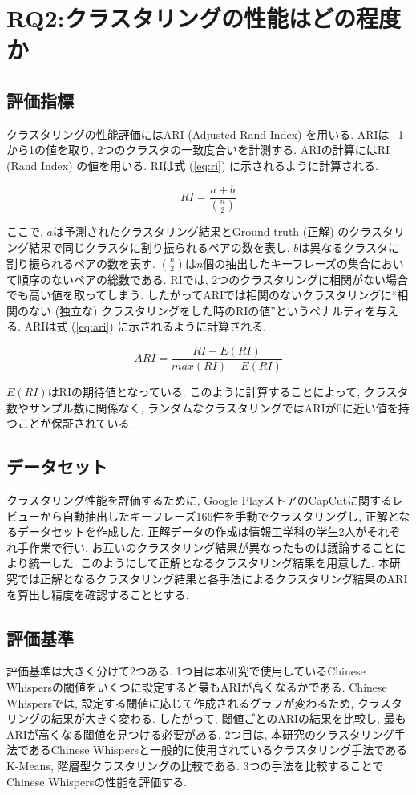 \section{RQ2:クラスタリングの性能はどの程度か}
\subsection{評価指標}
クラスタリングの性能評価にはARI (Adjusted Rand Index) を用いる. ARIは$-$1から1の値を取り, 2つのクラスタの一致度合いを計測する. 
ARIの計算にはRI (Rand Index) の値を用いる. RIは式 (\ref{eq:ri}) に示されるように計算される. 

\begin{equation}
  \label{eq:ri}
  RI = \frac{a+b}{\binom{n}{2}}
\end{equation}

ここで, \(a\)は予測されたクラスタリング結果とGround-truth (正解) のクラスタリング結果で同じクラスタに割り振られるペアの数を表し, \(b\)は異なるクラスタに割り振られるペアの数を表す. \(\binom{n}{2}\)は\(n\)個の抽出したキーフレーズの集合において順序のないペアの総数である. 
RIでは, 2つのクラスタリングに相関がない場合でも高い値を取ってしまう. したがってARIでは相関のないクラスタリングに``相関のない (独立な) クラスタリングをした時のRIの値''というペナルティを与える. ARIは式 (\ref{eq:ari}) に示されるように計算される. 

\begin{equation}
  \label{eq:ari}
  ARI = \frac{RI-E (RI) }{max (RI) -E (RI) }
\end{equation}

\(E(RI)\)はRIの期待値となっている. このように計算することによって, クラスタ数やサンプル数に関係なく, ランダムなクラスタリングではARIが0に近い値を持つことが保証されている. 

\subsection{データセット}
クラスタリング性能を評価するために, Google PlayストアのCapCutに関するレビューから自動抽出したキーフレーズ166件を手動でクラスタリングし, 正解となるデータセットを作成した. 正解データの作成は情報工学科の学生2人がそれぞれ手作業で行い, お互いのクラスタリング結果が異なったものは議論することにより統一した. 
このようにして正解となるクラスタリング結果を用意した. 本研究では正解となるクラスタリング結果と各手法によるクラスタリング結果のARIを算出し精度を確認することとする. 

\subsection{評価基準}
評価基準は大きく分けて2つある. 
1つ目は本研究で使用しているChinese Whispersの閾値をいくつに設定すると最もARIが高くなるかである. Chinese Whispersでは, 設定する閾値に応じて作成されるグラフが変わるため, クラスタリングの結果が大きく変わる. したがって, 閾値ごとのARIの結果を比較し, 最もARIが高くなる閾値を見つける必要がある. 
2つ目は, 本研究のクラスタリング手法であるChinese Whispersと一般的に使用されているクラスタリング手法であるK-Means, 階層型クラスタリングの比較である. 3つの手法を比較することでChinese Whispersの性能を評価する. 

